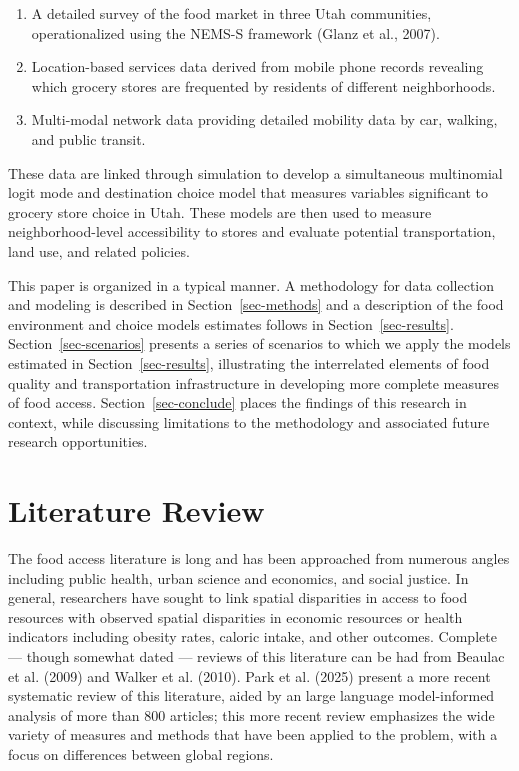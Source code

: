 \documentclass[
  letterpaper,
  number,
  review,
  3p]{elsarticle}
\providecommand{\tightlist}{%
  \setlength{\itemsep}{0pt}\setlength{\parskip}{0pt}}\usepackage{longtable,booktabs,array}
\begin{document}
\begin{enumerate}
\def\labelenumi{\arabic{enumi}.}
\tightlist
\item
  A detailed survey of the food market in three Utah communities,
  operationalized using the NEMS-S framework (Glanz et al., 2007).
\item
  Location-based services data derived from mobile phone records
  revealing which grocery stores are frequented by residents of
  different neighborhoods.
\item
  Multi-modal network data providing detailed mobility data by car,
  walking, and public transit.
\end{enumerate}

These data are linked through simulation to develop a simultaneous
multinomial logit mode and destination choice model that measures
variables significant to grocery store choice in Utah. These models are
then used to measure neighborhood-level accessibility to stores and
evaluate potential transportation, land use, and related policies.

This paper is organized in a typical manner. A methodology for data
collection and modeling is described in Section~\ref{sec-methods} and a
description of the food environment and choice models estimates follows
in Section~\ref{sec-results}. Section~\ref{sec-scenarios} presents a
series of scenarios to which we apply the models estimated in
Section~\ref{sec-results}, illustrating the interrelated elements of
food quality and transportation infrastructure in developing more
complete measures of food access. Section~\ref{sec-conclude} places the
findings of this research in context, while discussing limitations to
the methodology and associated future research opportunities.


\section{Literature Review}\label{sec-literature}

The food access literature is long and has been approached from numerous
angles including public health, urban science and economics, and social
justice. In general, researchers have sought to link spatial disparities
in access to food resources with observed spatial disparities in
economic resources or health indicators including obesity rates, caloric
intake, and other outcomes. Complete --- though somewhat dated ---
reviews of this literature can be had from Beaulac et al. (2009) and
Walker et al. (2010). Park et al. (2025) present a more recent
systematic review of this literature, aided by an large language
model-informed analysis of more than 800 articles; this more recent
review emphasizes the wide variety of measures and methods that have
been applied to the problem, with a focus on differences between global
regions.
\end{document}
